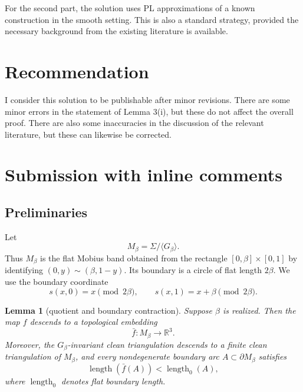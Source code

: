 \documentclass[12pt]{article}
\newtheorem{lemma}[theorem]{Lemma}
\newcommand{\R}{\mathbb R}
\newcommand{\len}{\operatorname{length}}
\begin{document}
For the second part, the solution uses PL approximations of a known construction in the smooth setting. This is also a standard strategy, provided the necessary background from the existing literature is available. 

\section{Recommendation}

  I consider this solution to be publishable after minor revisions. There are some minor errors in the statement of Lemma 3(i), but these do not affect the overall proof. There are also some inaccuracies in the discussion of the relevant literature, but these can likewise be corrected. 

  \section{Submission with inline comments}


\date{}


\begin{abstract}
We prove the stronger statement that a number \(\beta>0\) is realized in the sense of the question if and only if \(\beta>\sqrt 3\).  Hence the infimum of the set of realized numbers is \(\sqrt 3\).
\end{abstract}

\subsection{Preliminaries}

Let
\[
M_\beta=\Sigma/\langle G_\beta\rangle .
\]
Thus \(M_\beta\) is the flat Mobius band obtained from the rectangle
\([0,\beta]\times[0,1]\) by identifying \((0,y)\sim(\beta,1-y)\).  Its boundary is a circle of flat length \(2\beta\).  We use the boundary coordinate
\[
s(x,0)=x\pmod {2\beta},\qquad s(x,1)=x+\beta\pmod {2\beta}.
\]

\begin{lemma}[quotient and boundary contraction]
Suppose \(\beta\) is realized.  Then the map \(f\) descends to a topological embedding
\[
\bar f:M_\beta\longrightarrow \R^3 .
\]
Moreover, the \(G_\beta\)-invariant clean triangulation descends to a finite clean triangulation of \(M_\beta\), and every nondegenerate boundary arc \(A\subset \partial M_\beta\) satisfies
\[
\len(\bar f(A))<\len_0(A),
\]
where \(\len_0\) denotes flat boundary length.
\end{lemma}
\end{document}

